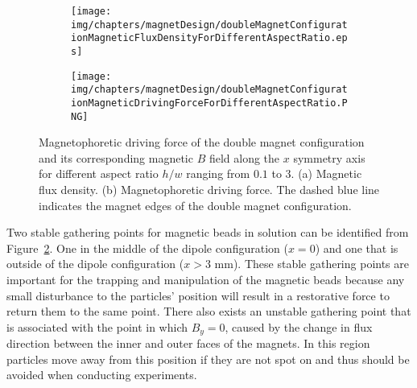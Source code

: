 \begin{figure}[!htb]
\centering
	\begin{subfigure}[b]{0.48\textwidth}
		\texttt{[image: img/chapters/magnetDesign/doubleMagnetConfigurationMagneticFluxDensityForDifferentAspectRatio.eps]}
	\caption{}
    \label{fig:doubleMagnetConfigurationMagneticFluxDensityAspectRatio}
    \end{subfigure}
    \hfill
	\begin{subfigure}[b]{0.48\textwidth}
		\texttt{[image: img/chapters/magnetDesign/doubleMagnetConfigurationMagneticDrivingForceForDifferentAspectRatio.PNG]}
	\caption{}
	\label{fig:doubleMagnetConfigurationMagneticDrivingFroceAspectRatio}
	\end{subfigure}
\caption[Magnetic $B$ field of the double magnet configuration and its magnetophoretic driving force along the $x$ symmetry axis for different magnet aspect ratio]{Magnetophoretic driving force of the double magnet configuration and its corresponding magnetic $B$ field along the $x$ symmetry axis for different aspect ratio $h/w$ ranging from $0.1$ to $3$. (a) Magnetic flux density. (b) Magnetophoretic driving force. The dashed blue line indicates the magnet edges of the double magnet configuration.}%
\label{fig:doubleMagnetConfigurationMagneticDrivingForceAndFluxDensityForDifferentAspectRatio}
\end{figure}

Two stable gathering points for magnetic beads in solution can be identified from Figure~\ref{fig:doubleMagnetConfigurationMagneticDrivingFroceAspectRatio}. One in the middle of the dipole configuration ($x=0$) and one that is outside of the dipole configuration ($x>3$ mm). These stable gathering points are important for the trapping and manipulation of the magnetic beads because any small disturbance to the particles' position will result in a restorative force to return them to the same point. There also exists an unstable gathering point that is associated with the point in which $B_{y} = 0$, caused by the change in flux direction between the inner and outer faces of the magnets. In this region particles move away from this position if they are not spot on and thus should be avoided when conducting experiments. 

